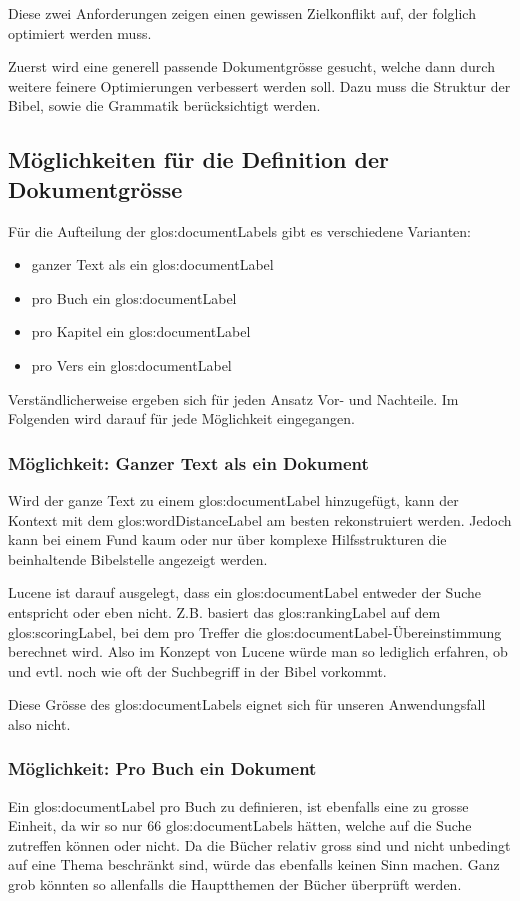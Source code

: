 Diese zwei Anforderungen zeigen einen gewissen Zielkonflikt auf, der folglich optimiert werden muss.

Zuerst wird eine generell passende Dokumentgrösse gesucht, welche dann durch weitere feinere Optimierungen verbessert werden soll.
Dazu muss die Struktur der Bibel, sowie die Grammatik berücksichtigt werden.

\subsection{Möglichkeiten für die Definition der Dokumentgrösse}
Für die Aufteilung der \glspl{glos:documentLabel} gibt es verschiedene Varianten:
\begin{itemize}
	\item ganzer Text als ein \gls{glos:documentLabel}
	\item pro Buch ein \gls{glos:documentLabel}
	\item pro Kapitel ein \gls{glos:documentLabel}
	\item pro Vers ein \gls{glos:documentLabel}
\end{itemize}

Verständlicherweise ergeben sich für jeden Ansatz Vor- und Nachteile.
Im Folgenden wird darauf für jede Möglichkeit eingegangen.

\subsubsection{Möglichkeit: Ganzer Text als ein Dokument}
Wird der ganze Text zu einem \gls{glos:documentLabel} hinzugefügt, kann der Kontext mit dem \gls{glos:wordDistanceLabel} am besten rekonstruiert werden.
Jedoch kann bei einem Fund kaum oder nur über komplexe Hilfsstrukturen die beinhaltende Bibelstelle angezeigt werden.

Lucene ist darauf ausgelegt, dass ein \gls{glos:documentLabel} entweder der Suche entspricht oder eben nicht.
Z.B. basiert das \gls{glos:rankingLabel} auf dem \gls{glos:scoringLabel}, bei dem pro Treffer die \gls{glos:documentLabel}-Übereinstimmung berechnet wird.
Also im Konzept von Lucene würde man so lediglich erfahren, ob und evtl. noch wie oft der Suchbegriff in der Bibel vorkommt.

Diese Grösse des \gls{glos:documentLabel}s eignet sich für unseren Anwendungsfall also nicht.

\subsubsection{Möglichkeit: Pro Buch ein Dokument}
Ein \gls{glos:documentLabel} pro Buch zu definieren, ist ebenfalls eine zu grosse Einheit, da wir so nur 66 \glspl{glos:documentLabel} hätten, welche auf die Suche zutreffen können oder nicht.
Da die Bücher relativ gross sind und nicht unbedingt auf eine Thema beschränkt sind, würde das ebenfalls keinen Sinn machen.
Ganz grob könnten so allenfalls die Hauptthemen der Bücher überprüft werden.

